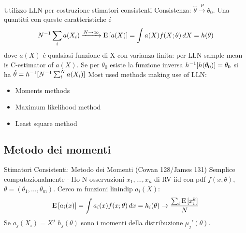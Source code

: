 \documentclass[asd-beamer.tex]{subfiles}
\begin{document}
\begin{frame}{Utilizzo LLN per costruzione stimatori consistenti}\frameintoc
Consistenza: $\hat{\theta}\xrightarrow{P}\theta_0$. Una quantit\'a con queste caratteristiche \'e
\[{N}^{-1}\sum_ia(X_i)\xrightarrow{N\to\infty}\operatorname{E}{[a(X)]}=\int a(X)f(X;\theta)\,dX=h(\theta)\]
dove $a(X)$ \'e qualsiasi funzione di X con varianza finita: per LLN sample mean is C-estimator of $a(X)$. Se per $\theta_0$ esiste la funzione inversa ${h}^{-1}[h(\theta_0)]=\theta_0$ si ha $\hat{\theta}={h}^{-1}[{N}^{-1}\sum_i^Na(X_i)]$
Most used methods making use of LLN:
\begin{itemize}
\item Moments methods
\item Maximum likelihood method
\item Least square method
\end{itemize}
\end{frame}

\subsection{Metodo dei momenti}

\begin{frame}{Stimatori Consistenti: Metodo dei Momenti (Cowan 128/James 131)}\frameintoc
Semplice computazionalmente - Ho N osservazioni $x_1,\ldots,x_n$ di RV iid con pdf $f(x,\theta)$, $\theta=(\theta_1,\ldots,\theta_m)$. Cerco m funzioni linindip $a_i(X)$:
\[\operatorname{E}{[a_i(x)]}=\int a_i(x)f(x;\theta)\,dx=h_i(\theta)\to\frac{\sum_i\operatorname{E}{[x_i^k]}}{N}\]
Se $a_j(X_i)=X^j$ $h_j(\theta)$ sono i momenti della distribuzione $\mu_j'(\theta)$.
\end{frame}
\end{document}
